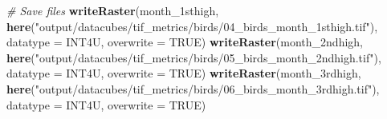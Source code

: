 \documentclass[
]{article}
\newenvironment{Shaded}{\begin{snugshade}}{\end{snugshade}}
\newcommand{\AttributeTok}[1]{\textcolor[rgb]{0.13,0.29,0.53}{#1}}
\newcommand{\CommentTok}[1]{\textcolor[rgb]{0.56,0.35,0.01}{\textit{#1}}}
\newcommand{\ConstantTok}[1]{\textcolor[rgb]{0.56,0.35,0.01}{#1}}
\newcommand{\FunctionTok}[1]{\textcolor[rgb]{0.13,0.29,0.53}{\textbf{#1}}}
\newcommand{\NormalTok}[1]{#1}
\newcommand{\StringTok}[1]{\textcolor[rgb]{0.31,0.60,0.02}{#1}}
\begin{document}
\begin{Shaded}
\begin{Highlighting}[]
\CommentTok{\# Save files}
\FunctionTok{writeRaster}\NormalTok{(month\_1sthigh, }\FunctionTok{here}\NormalTok{(}\StringTok{"output/datacubes/tif\_metrics/birds/04\_birds\_month\_1sthigh.tif"}\NormalTok{), }\AttributeTok{datatype =} \StringTok{\textquotesingle{}INT4U\textquotesingle{}}\NormalTok{, }\AttributeTok{overwrite =} \ConstantTok{TRUE}\NormalTok{)}
\FunctionTok{writeRaster}\NormalTok{(month\_2ndhigh, }\FunctionTok{here}\NormalTok{(}\StringTok{"output/datacubes/tif\_metrics/birds/05\_birds\_month\_2ndhigh.tif"}\NormalTok{), }\AttributeTok{datatype =} \StringTok{\textquotesingle{}INT4U\textquotesingle{}}\NormalTok{, }\AttributeTok{overwrite =} \ConstantTok{TRUE}\NormalTok{)}
\FunctionTok{writeRaster}\NormalTok{(month\_3rdhigh, }\FunctionTok{here}\NormalTok{(}\StringTok{"output/datacubes/tif\_metrics/birds/06\_birds\_month\_3rdhigh.tif"}\NormalTok{), }\AttributeTok{datatype =} \StringTok{\textquotesingle{}INT4U\textquotesingle{}}\NormalTok{, }\AttributeTok{overwrite =} \ConstantTok{TRUE}\NormalTok{)}
\end{Highlighting}
\end{Shaded}
\end{document}
